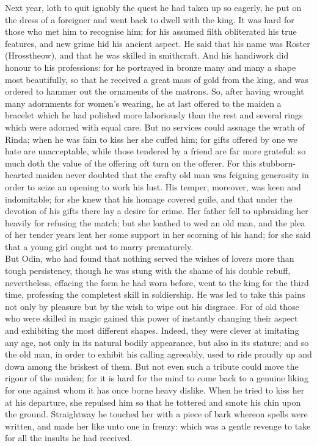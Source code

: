\documentclass[10pt,a4paper]{report}
\begin{document}
Next year, loth to quit ignobly the quest he had taken up so eagerly, he put on the dress of a foreigner and went back to dwell with the king. It was hard for those who met him to recognise him; for his assumed filth obliterated his true features, and new grime hid his ancient aspect. He said that his name was Roster (Hrosstheow), and that he was skilled in smithcraft. And his handiwork did honour to his professions: for he portrayed in bronze many and many a shape most beautifully, so that he received a great mass of gold from the king, and was ordered to hammer out the ornaments of the matrons. So, after having wrought many adornments for women's wearing, he at last offered to the maiden a bracelet which he had polished more laboriously than the rest and several rings which were adorned with equal care. But no services could assuage the wrath of Rinda; when he was fain to kiss her she cuffed him; for gifts offered by one we hate are unacceptable, while those tendered by a friend are far more grateful: so much doth the value of the offering oft turn on the offerer. For this stubborn-hearted maiden never doubted that the crafty old man was feigning generosity in order to seize an opening to work his lust. His temper, moreover, was keen and indomitable; for she knew that his homage covered guile, and that under the devotion of his gifts there lay a desire for crime. Her father fell to upbraiding her heavily for refusing the match; but she loathed to wed an old man, and the plea of her tender years lent her some support in her scorning of his hand; for she said that a young girl ought not to marry prematurely.\\

But Odin, who had found that nothing served the wishes of lovers more than tough persistency, though he was stung with the shame of his double rebuff, nevertheless, effacing the form he had worn before, went to the king for the third time, professing the completest skill in soldiership. He was led to take this pains not only by pleasure but by the wish to wipe out his disgrace. For of old those who were skilled in magic gained this power of instantly changing their aspect and exhibiting the most different shapes. Indeed, they were clever at imitating any age, not only in its natural bodily appearance, but also in its stature; and so the old man, in order to exhibit his calling agreeably, used to ride proudly up and down among the briskest of them. But not even such a tribute could move the rigour of the maiden; for it is hard for the mind to come back to a genuine liking for one against whom it has once borne heavy dislike. When he tried to kiss her at his departure, she repulsed him so that he tottered and smote his chin upon the ground. Straightway he touched her with a piece of bark whereon spells were written, and made her like unto one in frenzy: which was a gentle revenge to take for all the insults he had received.\\
\end{document}
